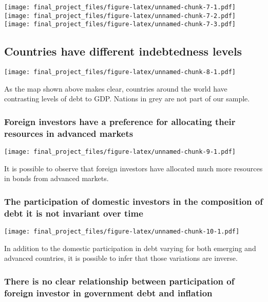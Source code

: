 \documentclass[
]{article}
\begin{document}
\texttt{[image: final\_project\_files/figure-latex/unnamed-chunk-7-1.pdf]}
\texttt{[image: final\_project\_files/figure-latex/unnamed-chunk-7-2.pdf]}
\texttt{[image: final\_project\_files/figure-latex/unnamed-chunk-7-3.pdf]}

\hypertarget{countries-have-different-indebtedness-levels}{%
\subsection{Countries have different indebtedness
levels}\label{countries-have-different-indebtedness-levels}}

\texttt{[image: final\_project\_files/figure-latex/unnamed-chunk-8-1.pdf]}

As the map shown above makes clear, countries around the world have
contrasting levels of debt to GDP. Nations in grey are not part of our
sample.

\hypertarget{foreign-investors-have-a-preference-for-allocating-their-resources-in-advanced-markets}{%
\subsubsection{Foreign investors have a preference for allocating their
resources in advanced
markets}\label{foreign-investors-have-a-preference-for-allocating-their-resources-in-advanced-markets}}

\texttt{[image: final\_project\_files/figure-latex/unnamed-chunk-9-1.pdf]}

It is possible to observe that foreign investors have allocated much
more resources in bonds from advanced markets.

\hypertarget{the-participation-of-domestic-investors-in-the-composition-of-debt-it-is-not-invariant-over-time}{%
\subsubsection{The participation of domestic investors in the
composition of debt it is not invariant over
time}\label{the-participation-of-domestic-investors-in-the-composition-of-debt-it-is-not-invariant-over-time}}

\texttt{[image: final\_project\_files/figure-latex/unnamed-chunk-10-1.pdf]}

In addition to the domestic participation in debt varying for both
emerging and advanced countries, it is possible to infer that those
variations are inverse.

\hypertarget{there-is-no-clear-relationship-between-participation-of-foreign-investor-in-government-debt-and-inflation}{%
\subsubsection{There is no clear relationship between participation of
foreign investor in government debt and
inflation}\label{there-is-no-clear-relationship-between-participation-of-foreign-investor-in-government-debt-and-inflation}}
\end{document}
